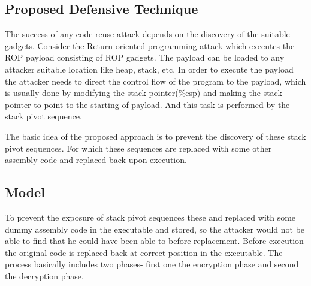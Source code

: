 \documentclass{article}
\begin{document}
\begin{multicols}{2}
	\section{Proposed Defensive Technique}
	The success of any code-reuse attack depends on the discovery of the suitable gadgets. Consider the Return-oriented programming attack which executes the ROP payload consisting of ROP gadgets. The payload can be loaded to any attacker suitable location like heap, stack, etc. In order to execute the payload the attacker needs to direct the control flow of the program to the payload, which is usually done by modifying the stack pointer(\%esp) and making the stack pointer to point to the starting of payload. And this task is performed by the stack pivot sequence.
	
	The basic idea of the proposed approach is to prevent the discovery of these stack pivot sequences. For which these sequences are replaced with some other assembly code and replaced back upon execution.
	
	\subsection{Model}
	To prevent the exposure of stack pivot sequences these and replaced with some dummy assembly code in the executable and stored, so the attacker would not be able to find that he could have been able to before replacement. Before execution the original code is replaced back at correct position in the executable. The process basically includes two phases- first one the encryption phase and second the decryption phase.\break
	

\end{multicols}
\end{document}
